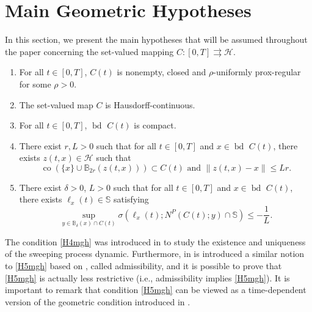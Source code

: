 \documentclass[preprint,12pt]{elsarticle}
\renewcommand{\H}{\mathcal{H}}
\newcommand{\tto}{\rightrightarrows}
\newcommand{\bd}{{\operatorname{bd \ }}}
\theoremstyle{plain}
\theoremstyle{definition}
\theoremstyle{remark}
\begin{document}
	\section{Main Geometric Hypotheses}\label{sec3}
    In this section, we present the main hypotheses that will be assumed throughout the paper concerning the set-valued mapping $C\colon [0,T]\tto \H$.
    \begin{enumerate}[label=$(\textsf{H}_{\arabic*})$]
		\item \label{H1mgh}  For all $t\in [0,T]$, $C(t)$ is nonempty, closed and $\rho$-uniformly prox-regular for some $\rho>0$.
		\item \label{H2mgh}  The set-valued map $C$ is Hausdorff-continuous.
		\item \label{H3mgh}  For all $t\in [0,T]$, $\bd C(t)$ is compact.
		\item \label{H4mgh}  There exist $r,L>0$ such that for all $t\in [0,T]$ and $x\in\bd C(t)$, there exists $z(t,x)\in \H$ such that 
		\begin{equation*}
			\operatorname{co}(\{x\}\cup\mathbb{B}_{2r}(z(t,x)))\subset C(t)\text{ and }\|z(t,x)-x\|\leq Lr.
		\end{equation*} 
		\item \label{H5mgh} There exist $\delta>0$, $L> 0$ such that for all $t\in [0,T]$ and $x\in\bd C(t)$, there exists $\ell_x(t)\in\mathbb{S}$ satisfying
		\begin{equation*}
			\sup_{y\in\mathbb{B}_{\delta}(x)\cap C(t)}\sigma(\ell_x(t);N^P(C(t);y)\cap \mathbb{S})\leq -\frac{1}{L}.
		\end{equation*}
	\end{enumerate}
    The condition \ref{H4mgh} was introduced in \cite{MR1946545} to study the existence and uniqueness of the sweeping process dynamic. Furthermore, in \cite[Definition 3.1]{MR2812587} is introduced a similar notion to \ref{H5mgh} based on \cite[eq. (5), p. 514]{MR745330}, called admissibility, and it is possible to prove that \ref{H5mgh} is actually less restrictive (i.e., admissibility implies \ref{H5mgh}). It is important to remark that condition \ref{H5mgh} can be viewed as a time-dependent version of the geometric condition introduced in \cite[Condition (B), p. 456]{MR873889}.

    
    
\end{document}
